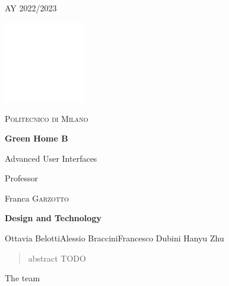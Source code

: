 \documentclass{article}
\begin{document}
\begin{titlepage}
    \centering
    {\scshape\large AY 2022/2023 \par}
    \vfill
    \includegraphics[width=100pt]{logo-polimi-new.pdf}
    \par\vspace{1cm}
    {\scshape\LARGE Politecnico di Milano \par}
    \vspace{1.5cm}
    {\huge\bfseries Green Home B\par}
    {\Large {Advanced User Interfaces}\par}
    \vfill
    {\large Professor\par Franca \textsc{Garzotto}}
    \vspace{2cm}
      \vfill
    {\huge {\textbf{Design and Technology}}\par}
      \vfill
    {\Large {Ottavia Belotti\quad Alessio Braccini\quad\quad\quad\quad\quad\quad\quad\quad Francesco Dubini \quad Hanyu Zhu}\par}
    
\end{titlepage}

\begin{abstract}
    abstract TODO
\end{abstract}
\newpage
{\huge{The team}}\\
\end{document}
